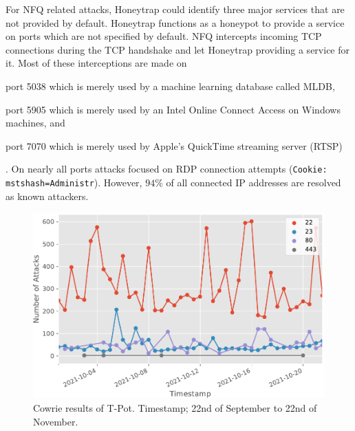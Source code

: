 For NFQ related attacks, Honeytrap could identify three major services that are not provided by default.
Honeytrap functions as a honeypot to provide a service on ports which are not specified by default.
NFQ intercepts incoming TCP connections during the TCP handshake and let Honeytrap providing a service for it.
Most of these interceptions are made on
\begin{enumerate*}[label=(\roman*)]
    \item port 5038 which is merely used by a machine learning database called MLDB,
    \item port 5905 which is merely used by an Intel Online Connect Access on Windows machines, and
    \item port 7070 which is merely used by Apple's QuickTime streaming server (RTSP)
\end{enumerate*}.
On nearly all ports attacks focused on RDP connection attempts (\verb|Cookie: mstshash=Administr|).
However, $94\%$ of all connected IP addresses are resolved as known attackers.

\begin{figure}[ht]
    \centering
    \includegraphics[width=\textwidth]{figures/tpot-cowrie-port.pdf}
    \caption[Cowrie results of T-Pot]{Cowrie results of T-Pot. Timestamp; 22nd of September to 22nd of November.}
    \label{fig:cowrie-results}
\end{figure}

